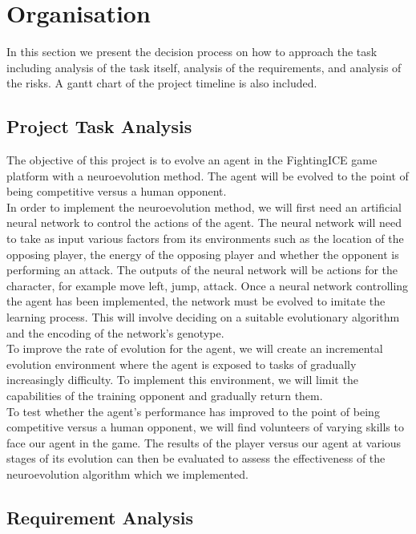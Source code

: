 \documentclass[12pt,a4paper]{article}
\begin{document}
\newpage
\section{Organisation}
In this section we present the decision process on how to approach the task including analysis of the task itself, analysis of the requirements, and analysis of the risks. A gantt chart of the project timeline is also included.
\subsection{Project Task Analysis}
The objective of this project is to evolve an agent in the FightingICE game platform with a neuroevolution method. The agent will be evolved to the point of being competitive versus a human opponent. \\

In order to implement the neuroevolution method, we will first need an artificial neural network to control the actions of the agent. The neural network will need to take as input various factors from its environments such as the location of the opposing player, the energy of the opposing player and whether the opponent is performing an attack. The outputs of the neural network will be actions for the character, for example move left, jump, attack. Once a neural network controlling the agent has been implemented, the network must be evolved to imitate the learning process. This will involve deciding on a suitable evolutionary algorithm and the encoding of the network's genotype.\\

To improve the rate of evolution for the agent, we will create an incremental evolution environment where the agent is exposed to tasks of gradually increasingly difficulty. To implement this environment, we will limit the capabilities of the training opponent and gradually return them.\\

To test whether the agent's performance has improved to the point of being competitive versus a human opponent, we will find volunteers of varying skills to face our agent in the game. The results of the player versus our agent at various stages of its evolution can then be evaluated to assess the effectiveness of the neuroevolution algorithm which we implemented.
\newpage
\subsection{Requirement Analysis}
\end{document}
